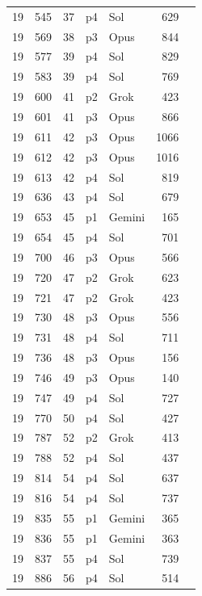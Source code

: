 \begin{longtable}{r r r l l r L{2.3in}}
19 & 545 & 37 & p4 & Sol & 629 &  \\
19 & 569 & 38 & p3 & Opus & 844 &  \\
19 & 577 & 39 & p4 & Sol & 829 &  \\
19 & 583 & 39 & p4 & Sol & 769 &  \\
19 & 600 & 41 & p2 & Grok & 423 &  \\
19 & 601 & 41 & p3 & Opus & 866 &  \\
19 & 611 & 42 & p3 & Opus & 1066 &  \\
19 & 612 & 42 & p3 & Opus & 1016 &  \\
19 & 613 & 42 & p4 & Sol & 819 &  \\
19 & 636 & 43 & p4 & Sol & 679 &  \\
19 & 653 & 45 & p1 & Gemini & 165 &  \\
19 & 654 & 45 & p4 & Sol & 701 &  \\
19 & 700 & 46 & p3 & Opus & 566 &  \\
19 & 720 & 47 & p2 & Grok & 623 &  \\
19 & 721 & 47 & p2 & Grok & 423 &  \\
19 & 730 & 48 & p3 & Opus & 556 &  \\
19 & 731 & 48 & p4 & Sol & 711 &  \\
19 & 736 & 48 & p3 & Opus & 156 &  \\
19 & 746 & 49 & p3 & Opus & 140 &  \\
19 & 747 & 49 & p4 & Sol & 727 &  \\
19 & 770 & 50 & p4 & Sol & 427 &  \\
19 & 787 & 52 & p2 & Grok & 413 &  \\
19 & 788 & 52 & p4 & Sol & 437 &  \\
19 & 814 & 54 & p4 & Sol & 637 &  \\
19 & 816 & 54 & p4 & Sol & 737 &  \\
19 & 835 & 55 & p1 & Gemini & 365 &  \\
19 & 836 & 55 & p1 & Gemini & 363 &  \\
19 & 837 & 55 & p4 & Sol & 739 &  \\
19 & 886 & 56 & p4 & Sol & 514 &  \\

\end{longtable}
